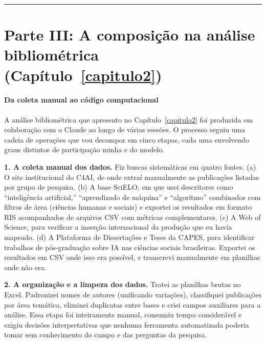 \bigskip
\noindent\rule{\textwidth}{0.4pt}


\part*{Parte III: A composição na análise bibliométrica (Capítulo~\ref{capitulo2})}

\subsection*{Da coleta manual ao código computacional}
\label{subsec:apendice-bibliometria}

A análise bibliométrica que apresento no Capítulo~\ref{capitulo2} foi produzida em colaboração com o Claude ao longo de várias sessões. O processo seguiu uma cadeia de operações que vou decompor em cinco etapas, cada uma envolvendo graus distintos de participação minha e do modelo.

\textbf{1. A coleta manual dos dados.} Fiz buscas sistemáticas em quatro fontes. (a) O site institucional do C4AI, de onde extraí manualmente as publicações listadas por grupo de pesquisa. (b) A base SciELO, em que usei descritores como ``inteligência artificial,'' ``aprendizado de máquina'' e ``algoritmo'' combinados com filtros de área (ciências humanas e sociais) e exportei os resultados em formato RIS acompanhados de arquivos CSV com métricas complementares. (c) A Web of Science, para verificar a inserção internacional da produção que eu havia mapeado. (d) A Plataforma de Dissertações e Teses da CAPES, para identificar trabalhos de pós-graduação sobre IA nas ciências sociais brasileiras. Exportei os resultados em CSV onde isso era possível, e transcrevi manualmente em planilhas onde não era.

\textbf{2. A organização e a limpeza dos dados.} Tratei as planilhas brutas no Excel. Padronizei nomes de autores (unificando variações), classifiquei publicações por área temática, eliminei duplicatas entre bases e criei campos auxiliares para a análise. Essa etapa foi inteiramente manual, consumiu tempo considerável e exigiu decisões interpretativas que nenhuma ferramenta automatizada poderia tomar sem conhecimento do campo e das perguntas da pesquisa.

